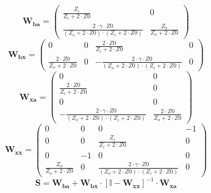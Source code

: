 \[ \mathbf{W_{ba}} = \left(\begin{smallmatrix} \frac{Z_i}{Z_i+2\cdot
Z0} & 0 \\ \frac{2\cdot \gamma\cdot Z0}{\left(Z_o+2\cdot
Z0\right)\cdot\left(Z_i+2\cdot Z0\right)} & \frac{Z_o}{Z_o+2\cdot Z0}
\end{smallmatrix}\right) \]
\[ \mathbf{W_{bx}} = \left(\begin{smallmatrix} 0 & 0 & \frac{2\cdot
Z0}{Z_i+2\cdot Z0} & 0 \\ \frac{2\cdot Z0}{Z_o+2\cdot Z0} & 0 &
-\frac{2\cdot \gamma\cdot Z0}{\left(Z_o+2\cdot
Z0\right)\cdot\left(Z_i+2\cdot Z0\right)} & 0 \end{smallmatrix}\right)
\]
\[ \mathbf{W_{xa}} = \left(\begin{smallmatrix} 0 & 0 \\ \frac{2\cdot
Z0}{Z_i+2\cdot Z0} & 0 \\ 0 & 0 \\ -\frac{2\cdot \gamma\cdot
Z0}{\left(Z_o+2\cdot Z0\right)\cdot\left(Z_i+2\cdot Z0\right)} &
\frac{2\cdot Z0}{Z_o+2\cdot Z0} \end{smallmatrix}\right) \]
\[ \mathbf{W_{xx}} = \left(\begin{smallmatrix} 0 & 0 & 0 & -1 \\ 0 & 0
& \frac{Z_i}{Z_i+2\cdot Z0} & 0 \\ 0 & -1 & 0 & 0 \\
\frac{Z_o}{Z_o+2\cdot Z0} & 0 & \frac{2\cdot \gamma\cdot
Z0}{\left(Z_o+2\cdot Z0\right)\cdot\left(Z_i+2\cdot Z0\right)} & 0
\end{smallmatrix}\right) \]
\[ \mathbf{S}=\mathbf{W_{ba}}+\mathbf{W_{bx}}\cdot\left[ \mathbb{I}
-\mathbf{W_{xx}}\right]^{-1}\cdot\mathbf{W_{xa}} \]
